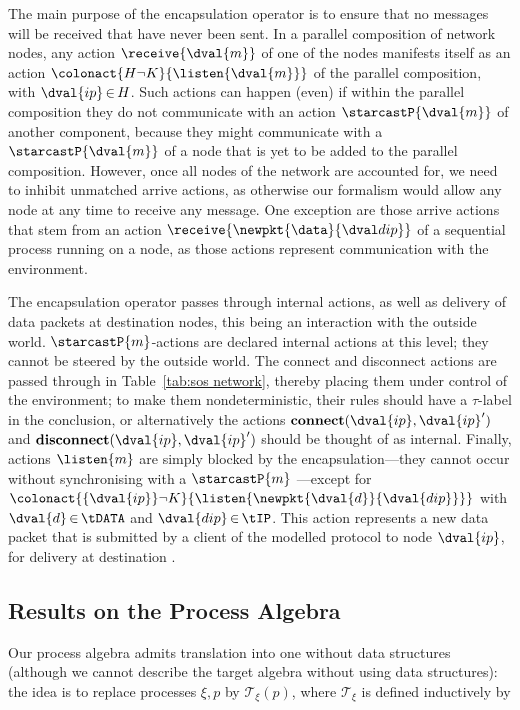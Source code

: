 \documentclass[envcountsame,envcountsect,orivec,runningheads]{llncs}
\begin{document}
The main purpose of the encapsulation operator is to ensure that no
messages will be received that have never been sent. 
In a parallel
composition of network nodes, any action $\receive{\dval{m}}$ of one
of the nodes  manifests itself as an action $\colonact{H\neg
K}{\listen{\dval{m}}}$ of the parallel composition, with $\dval{ip}\mathop\in H$.
Such actions can happen (even) if within the parallel composition
they do not communicate with an action $\starcastP{\dval{m}}$ of
another component, because they might communicate with a
$\starcastP{\dval{m}}$ of a node that is yet to be added to the
parallel composition. However, once all nodes of the network are
accounted for, we need to inhibit unmatched arrive actions,
as otherwise our formalism would allow any node at any time to receive
any message. One exception are those arrive actions
that stem from an action $\receive{\newpkt{\data}{\dip}}$ of a
sequential process running on a node, as those actions represent
communication with the environment.

The encapsulation operator passes through internal actions, as well as
delivery of data packets at destination nodes, this being an
interaction with the outside world. $\starcastP{m}$-actions are
declared internal actions at this level; they cannot be steered by the
outside world.  The connect and disconnect actions are passed through
in Table~\ref{tab:sos network}, thereby placing them under control of
the environment; to make them nondeterministic, their rules should
have a $\tau$-label in the conclusion, or alternatively the actions
$\textbf{connect}(\dval{ip},\dval{ip}')$ and
$\textbf{disconnect}(\dval{ip},\dval{ip}')$ should be thought of as
internal. Finally, actions $\listen{m}$ are simply blocked by
the encapsulation---they cannot occur without synchronising with a
$\starcastP{m}$ ---except for $\colonact{\{\dval{ip}\}\neg K}
{\listen{\newpkt{\dval{d}}{\dval{dip}}}}$ with
$\dval{d}\mathop\in\tDATA$ and $\dval{dip}\mathop\in \tIP$. This
action represents a new data packet  that is submitted by a
client of the modelled protocol to node $\dval{ip}$, for delivery at
destination .

\subsection{Results on the Process Algebra}
Our process algebra admits translation into one without data structures
(although we cannot describe the target algebra without using data structures):
the idea is to replace processes $\xi,p$ by $\mathcal{T}_\xi(p)$, where $\mathcal{T}_\xi$ is
defined inductively by
\end{document}
